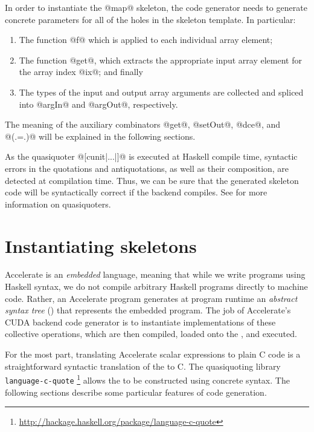 In order to instantiate the @map@ skeleton, the code generator needs to
generate concrete parameters for all of the holes in the skeleton template. In
particular:
%
\begin{enumerate}
\item The function @f@ which is applied to each individual array element;

\item The function @get@, which extracts the appropriate input array
    element for the array index @ix@; and finally

\item The types of the input and output array arguments are collected and
    spliced into @argIn@ and @argOut@, respectively.

\end{enumerate}
%
The meaning of the auxiliary combinators @get@, @setOut@, @dce@, and @(.=.)@
will be explained in the following sections.

As the quasiquoter @[cunit|...|]@ is executed at Haskell compile time,
syntactic errors in the quotations and antiquotations, as well as their
composition, are detected at compilation time. Thus, we can be sure that the
generated skeleton code will be syntactically correct if the backend compiles.
See \cite{Mainland:2007bl} for more information on quasiquoters.


\section{Instantiating skeletons}

Accelerate is an \emph{embedded} language, meaning that while we write programs
using Haskell syntax, we do not compile arbitrary Haskell programs directly to
\GPU machine code. Rather, an Accelerate program generates at program runtime an
\emph{abstract syntax tree} (\AST{}) that
represents the embedded program.
The job of Accelerate's CUDA backend code generator is to instantiate \CUDA
implementations of these collective operations, which are then compiled, loaded
onto the \GPU, and executed.

For the most part, translating Accelerate scalar expressions to plain \CUDA C
code is a straightforward syntactic translation of the  \AST
to C. The quasiquoting library \texttt{language-c-quote}%
\footnote{\url{http://hackage.haskell.org/package/language-c-quote}} allows the
\CUDA \AST to be constructed using concrete syntax. The following sections
describe some particular features of code generation.

